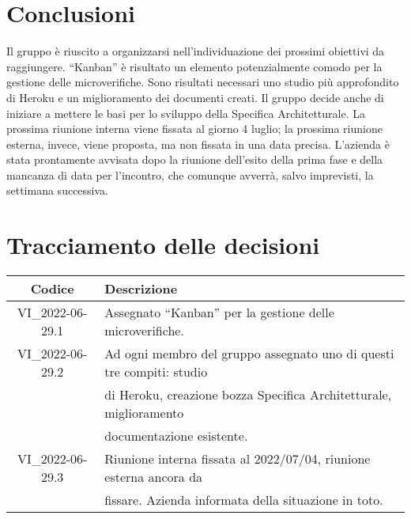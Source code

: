 \section{Conclusioni}
Il gruppo è riuscito a organizzarsi nell'individuazione dei prossimi obiettivi da raggiungere.
\newline
``Kanban'' è risultato un elemento potenzialmente comodo per la gestione delle microverifiche.
\newline
Sono risultati necessari uno studio più approfondito di Heroku e un miglioramento dei documenti creati. Il gruppo decide 
anche di iniziare a mettere le basi per lo sviluppo della Specifica Architetturale.
\newline
La prossima riunione interna viene fissata al giorno 4 luglio; la prossima riunione esterna, invece, viene proposta, ma non 
fissata in una data precisa. L'azienda è stata prontamente avvisata dopo la riunione dell'esito della prima fase e della 
mancanza di data per l'incontro, che comunque avverrà, salvo imprevisti, la settimana successiva.
\newpage

\section*{Tracciamento delle decisioni}
	\renewcommand{\arraystretch}{1.8} %
	\begin{tabular}{ |c|l| }
		\hline
		\textbf{Codice} & \textbf{Descrizione} \\
		\hline
		VI\_2022-06-29.1 & Assegnato ``Kanban'' per la gestione delle microverifiche.\\ %
		\hline
		VI\_2022-06-29.2 & Ad ogni membro del gruppo assegnato uno di questi tre compiti: studio \\ & di Heroku, 
		creazione bozza Specifica Architetturale, miglioramento \\ & documentazione esistente.\\ %
		\hline
		VI\_2022-06-29.3 & Riunione interna fissata al 2022/07/04, riunione esterna ancora da \\ & fissare. 
		Azienda informata della situazione in toto.\\ %
		\hline
	\end{tabular}